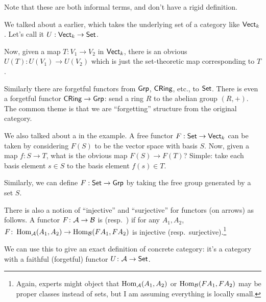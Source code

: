 \begin{example}
	Note that these are both informal terms,
	and don't have a rigid definition.
	\begin{enumerate}[(a)]
		\ii We talked about a  earlier,
		which takes the underlying set of a category like $\mathsf{Vect}_k$.
		Let's call it $U : \mathsf{Vect}_k \to \mathsf{Set}$.

		Now, given a map $T : V_1 \to V_2$ in $\mathsf{Vect}_k$,
		there is an obvious $U(T) : U(V_1) \to U(V_2)$ which is just
		the set-theoretic map corresponding to $T$.

		Similarly there are forgetful functors from
		$\mathsf{Grp}$, $\mathsf{CRing}$, etc., to $\mathsf{Set}$.
		There is even a forgetful functor $\mathsf{CRing} \to \mathsf{Grp}$:
		send a ring $R$ to the abelian group $(R,+)$.
		The common theme is that we are ``forgetting'' structure
		from the original category.

		\ii We also talked about a  in the example.
		A free functor $F : \mathsf{Set} \to \mathsf{Vect}_k$ can be taken by considering
		$F(S)$ to be the vector space with basis $S$.
		Now, given a map $f : S \to T$, what is the obvious map $F(S) \to F(T)$?
		Simple: take each basis element $s \in S$ to the basis element $f(s) \in T$.

		Similarly, we can define $F : \mathsf{Set} \to \mathsf{Grp}$
		by taking the free group generated by a set $S$.
	\end{enumerate}
\end{example}

\begin{remark}
	There is also a notion of ``injective'' and ``surjective''
	for functors (on arrows) as follows.
	A functor $F \colon \mathcal A \to \mathcal B$ is 
	(resp.\ ) if for any $A_1, A_2$,
	$F \colon \operatorname{Hom}_\mathcal A(A_1, A_2) \to \operatorname{Hom}_\mathcal B(FA_1, FA_2)$
	is injective (resp.\ surjective).\footnote{Again,
		experts might object that $\operatorname{Hom}_\mathcal A(A_1, A_2)$
		or $\operatorname{Hom}_\mathcal B(FA_1, FA_2)$ may be proper classes instead of sets,
		but I am assuming everything is locally small.}

	We can use this to give an exact definition of concrete category:
	it's a category with a faithful (forgetful) functor
	$U \colon \mathcal A \to \mathsf{Set}$.
\end{remark}

